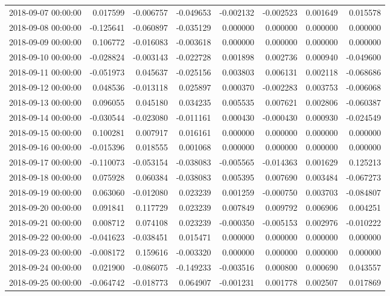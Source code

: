 \begin{tabular}{lrrrrrrr}
2018-09-07 00:00:00 & 0.017599 & -0.006757 & -0.049653 & -0.002132 & -0.002523 & 0.001649 & 0.015578 \\
2018-09-08 00:00:00 & -0.125641 & -0.060897 & -0.035129 & 0.000000 & 0.000000 & 0.000000 & 0.000000 \\
2018-09-09 00:00:00 & 0.106772 & -0.016083 & -0.003618 & 0.000000 & 0.000000 & 0.000000 & 0.000000 \\
2018-09-10 00:00:00 & -0.028824 & -0.003143 & -0.022728 & 0.001898 & 0.002736 & 0.000940 & -0.049600 \\
2018-09-11 00:00:00 & -0.051973 & 0.045637 & -0.025156 & 0.003803 & 0.006131 & 0.002118 & -0.068686 \\
2018-09-12 00:00:00 & 0.048536 & -0.013118 & 0.025897 & 0.000370 & -0.002283 & 0.003753 & -0.006068 \\
2018-09-13 00:00:00 & 0.096055 & 0.045180 & 0.034235 & 0.005535 & 0.007621 & 0.002806 & -0.060387 \\
2018-09-14 00:00:00 & -0.030544 & -0.023080 & -0.011161 & 0.000430 & -0.000430 & 0.000930 & -0.024549 \\
2018-09-15 00:00:00 & 0.100281 & 0.007917 & 0.016161 & 0.000000 & 0.000000 & 0.000000 & 0.000000 \\
2018-09-16 00:00:00 & -0.015396 & 0.018555 & 0.001068 & 0.000000 & 0.000000 & 0.000000 & 0.000000 \\
2018-09-17 00:00:00 & -0.110073 & -0.053154 & -0.038083 & -0.005565 & -0.014363 & 0.001629 & 0.125213 \\
2018-09-18 00:00:00 & 0.075928 & 0.060384 & -0.038083 & 0.005395 & 0.007690 & 0.003484 & -0.067273 \\
2018-09-19 00:00:00 & 0.063060 & -0.012080 & 0.023239 & 0.001259 & -0.000750 & 0.003703 & -0.084807 \\
2018-09-20 00:00:00 & 0.091841 & 0.117729 & 0.023239 & 0.007849 & 0.009792 & 0.006906 & 0.004251 \\
2018-09-21 00:00:00 & 0.008712 & 0.074108 & 0.023239 & -0.000350 & -0.005153 & 0.002976 & -0.010222 \\
2018-09-22 00:00:00 & -0.041623 & -0.038451 & 0.015471 & 0.000000 & 0.000000 & 0.000000 & 0.000000 \\
2018-09-23 00:00:00 & -0.008172 & 0.159616 & -0.003320 & 0.000000 & 0.000000 & 0.000000 & 0.000000 \\
2018-09-24 00:00:00 & 0.021900 & -0.086075 & -0.149233 & -0.003516 & 0.000800 & 0.000690 & 0.043557 \\
2018-09-25 00:00:00 & -0.064742 & -0.018773 & 0.064907 & -0.001231 & 0.001778 & 0.002507 & 0.017869 \\

\end{tabular}
